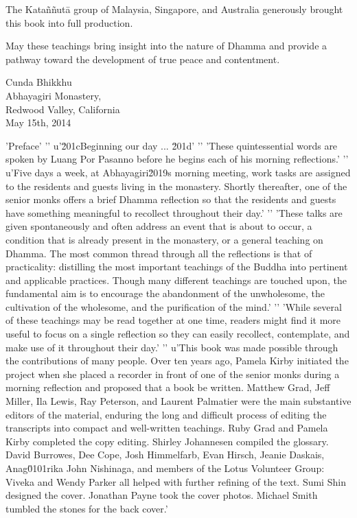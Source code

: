 The Kataññutā group of Malaysia, Singapore, and Australia generously 
brought this book into full production.

May these teachings bring insight into the nature of Dhamma and provide 
a pathway toward the development of true peace and contentment.

Cunda Bhikkhu\\
Abhayagiri Monastery,\\
Redwood Valley, California\\
May 15th, 2014

'Preface'
'\n'
u'\u201cBeginning our day ... \u201d'
'\n'
'These quintessential words are spoken by Luang Por Pasanno before he begins each of his morning reflections.'
'\n'
u'Five days a week, at Abhayagiri\u2019s morning meeting, work tasks are assigned to the residents and guests living in the monastery. Shortly thereafter, one of the senior monks offers a brief Dhamma reflection so that the residents and guests have something meaningful to recollect throughout their day.'
'\n'
'These talks are given spontaneously and often address an event that is about to occur, a condition that is already present in the monastery, or a general teaching on Dhamma. The most common thread through all the reflections is that of practicality: distilling the most important teachings of the Buddha into pertinent and applicable practices. Though many different teachings are touched upon, the fundamental aim is to encourage the abandonment of the unwholesome, the cultivation of the wholesome, and the purification of the mind.'
'\n'
'While several of these teachings may be read together at one time, readers might find it more useful to focus on a single reflection so they can easily recollect, contemplate, and make use of it throughout their day.'
'\n'
u'This book was made possible through the contributions of many people. Over ten years ago, Pamela Kirby initiated the project when she placed a recorder in front of one of the senior monks during a morning reflection and proposed that a book be written. Matthew Grad, Jeff Miller, Ila Lewis, Ray Peterson, and Laurent Palmatier were the main substantive editors of the material, enduring the long and difficult process of editing the transcripts into compact and well-written teachings. Ruby Grad and Pamela Kirby completed the copy editing. Shirley Johannesen compiled the glossary. David Burrowes, Dee Cope, Josh Himmelfarb, Evan Hirsch, Jeanie Daskais, Anag\u0101rika John Nishinaga, and members of the Lotus Volunteer Group: Viveka and Wendy Parker all helped with further refining of the text. Sumi Shin designed the cover. Jonathan Payne took the cover photos. Michael Smith tumbled the stones for the back cover.'
